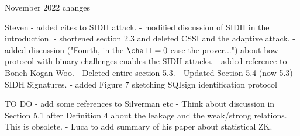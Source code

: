 November 2022 changes

Steven
- added cites to SIDH attack.
- modified discussion of SIDH in the introduction.
- shortened section 2.3 and deleted CSSI and the adaptive attack.
- added discussion ("Fourth, in the $\chall=0$ case the prover...") about how protocol with binary challenges enables the SIDH attacks.
- added reference to Boneh-Kogan-Woo.
- Deleted entire section 5.3.
- Updated Section 5.4 (now 5.3) SIDH Signatures.
- added Figure 7 sketching SQIsign identification protocol 


TO DO
- add some references to Silverman etc
- Think about discussion in Section 5.1 after Definition 4 about the leakage and the weak/strong relations. This is obsolete.
- Luca to add summary of his paper about statistical ZK.